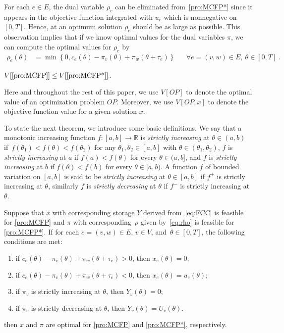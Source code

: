 \documentclass{svjour3}                     \smartqed
\newcommand{\rr}{\ensuremath{\mathbb{R}}}
\begin{document}
For each $e\in E$, the dual variable $\rho_e$ can be eliminated from~\eqref{pro:MCFP*} since it appears in the objective function integrated with $u_e$ which is nonnegative on $[0,T]$. Hence, at an optimum solution $\rho_e$ should be as large as possible. This observation implies that if we know optimal values for the dual variables $\pi$, we can compute the optimal values for $\rho_{e}$ by
\begin{align}
\label{eq:rho}
\rho_{e}(\theta)&=\min\left\{0,c_{e}(\theta)-\pi_v(\theta)+\pi_w(\theta+\tau_e)\right\} &&\forall e=(v,w)\in E,~\theta\in [0,T]~.
\end{align}


\begin{theorem}
\label{thm:WeakDuality} $V[\eqref{pro:MCFP}]\leq V[\eqref{pro:MCFP*}]$.
\end{theorem}
Here and throughout the rest of this paper, we use  $V[OP]$ to denote the optimal value of an optimization problem $OP$. Moreover, we use $V[OP,x]$ to denote the objective function value for a given solution $x$. 

To state the next theorem, we introduce some basic definitions. We say that a monotonic increasing function $f:[a,b]\rightarrow \rr$ is \emph{strictly increasing} at $\theta\in(a,b)$ if~${f(\theta_1)<f(\theta)<f(\theta_2)}$ for any $\theta_1,\theta_2\in [a,b]$ with $\theta\in(\theta_1,\theta_2)$, $f$ is \emph{strictly increasing} at $a$ if $f(a)<f(\theta)$ for every $\theta\in(a,b]$, and $f$ is \emph{strictly increasing} at $b$ if $f(\theta)<f(b)$ for every $\theta\in[a,b)$. A function $f$ of bounded variation on $[a,b]$ is said to be \emph{strictly increasing} at $\theta\in [a,b]$ if $f^{+}$ is strictly increasing at $\theta$, similarly $f$ is \emph{strictly decreasing} at $\theta$ if $f^{-}$ is strictly increasing at $\theta$.


\begin{theorem}
\label{thm:CS} Suppose that $x$  with corresponding
storage $Y$ derived from~\eqref{eq:FCC} is feasible for \eqref{pro:MCFP} and $\pi$ with
corresponding~$\rho$ given by~\eqref{eq:rho} is feasible for \eqref{pro:MCFP*}. If for each $e=(v,w)\in E$, $v\in V$, and~${\theta\in [0,T]}$, the following conditions are met:
\begin{enumerate}[label = (CS\arabic*), leftmargin = *]
  \item\label{it:CS1} if $c_{e}(\theta)-\pi_v(\theta)+\pi_w(\theta+\tau_e)>0$, then
  $x_e(\theta)=0$;
  \item\label{it:CS2} if $c_{e}(\theta)-\pi_v(\theta)+\pi_w(\theta+\tau_e)<0$, then $x_e(\theta)=u_{e}(\theta)$;
  \item\label{it:CS3} if $\pi_v$ is strictly increasing at $\theta$, then
  $Y_v(\theta)=0$;
  \item\label{it:CS4} if $\pi_v$ is strictly decreasing at $\theta$, then
  $Y_v(\theta)=U_v(\theta)$.
\end{enumerate}
then $x$ and $\pi$ are optimal for \eqref{pro:MCFP} and \eqref{pro:MCFP*}, respectively.
\end{theorem}
\end{document}
